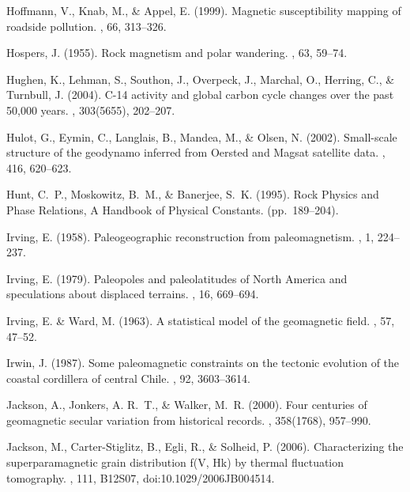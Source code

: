 Hoffmann, V., Knab, M., \& Appel, E. (1999).
\newblock Magnetic susceptibility mapping of roadside pollution.
, 66, 313--326.

Hospers, J. (1955).
\newblock Rock magnetism and polar wandering.
, 63, 59--74.

Hughen, K., Lehman, S., Southon, J., Overpeck, J., Marchal, O., Herring, C., \&
  Turnbull, J. (2004).
\newblock C-14 activity and global carbon cycle changes over the past 50,000
  years.
, 303(5655), 202--207.

Hulot, G., Eymin, C., Langlais, B., Mandea, M., \& Olsen, N. (2002).
\newblock Small-scale structure of the geodynamo inferred from Oersted and
  Magsat satellite data.
, 416, 620--623.

Hunt, C.~P., Moskowitz, B.~M., \& Banerjee, S.~K. (1995).
\newblock Rock Physics and Phase Relations, A Handbook of Physical Constants.
\newblock (pp.\ 189--204).

Irving, E. (1958).
\newblock Paleogeographic reconstruction from paleomagnetism.
, 1, 224--237.

Irving, E. (1979).
\newblock Paleopoles and paleolatitudes of North America and speculations about
  displaced terrains.
, 16, 669--694.

Irving, E. \& Ward, M. (1963).
\newblock A statistical model of the geomagnetic field.
, 57, 47--52.

Irwin, J. (1987).
\newblock Some paleomagnetic constraints on the tectonic evolution of the
  coastal cordillera of central Chile.
, 92, 3603--3614.

Jackson, A., Jonkers, A. R.~T., \& Walker, M.~R. (2000).
\newblock Four centuries of geomagnetic secular variation from historical
  records.
, 358(1768), 957--990.

Jackson, M., Carter-Stiglitz, B., Egli, R., \& Solheid, P. (2006).
\newblock Characterizing the superparamagnetic grain distribution f(V, Hk) by
  thermal fluctuation tomography.
, 111, B12S07, doi:10.1029/2006JB004514.

